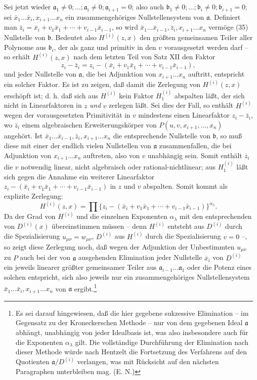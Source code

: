 \documentclass[11pt]{article}
\providecommand{\aideal}{\mathfrak a}
\providecommand{\bideal}{\mathfrak b}
\begin{document}
Sei jetzt wieder $\aideal_1\ne0;\ldots;\aideal_i\ne0;\aideal_{i+1}=0$; also auch $\bideal_1\ne0;\ldots;\bideal_i\ne0;\bideal_{i+1}=0$; sei $\bar x_1\ldots\bar x_i,x_{i+1}\ldots x_n$ ein zusammengehöriges Nullstellensystem von $\aideal$. Definiert man $\bar z_i=\bar x_i+v_1\bar x_1+\cdots+v_{i-1}\bar x_{i-1}$, so wird $\bar x_1\ldots\bar x_{i-1},\bar z_i,x_{i+1}\ldots x_n$ vermöge (35) Nullstelle von $\bideal$. Bedeutet also $H^{(i)}(z,x)$ den größten gemeinsamen Teiler aller Polynome aus $\bideal_i$, der als ganz und primitiv in den $v$ vorausgesetzt werden darf -- so erhält $H^{(i)}(z,x)$ nach dem letzten Teil von Satz XII den Faktor
\[
 z_i-\bar z_i=z_i-(\bar x_i+v_1\bar x_1+\cdots+v_{i-1}\bar x_{i-1}),
\]
und jeder Nullstelle von $\aideal$, die bei Adjunktion von $x_{i+1}\ldots x_n$ auftritt, entspricht ein solcher Faktor. Es ist zu zeigen, daß damit die Zerlegung von $H^{(i)}(z,x)$ erschöpft ist; d. h. daß sich aus $H^{(i)}$ kein Faktor $H^{(i)}_1$ abspalten läßt, der sich nicht in Linearfaktoren in $z$ \emph{und} $v$ zerlegen läßt. Sei dies der Fall, so enthält $H^{(i)}$ wegen der vorausgesetzten Primitivität in $v$ mindestens einen Linearfaktor $z_i-\bar z_i$, wo $\bar z_i$ einem algebraischen Erweiterungskörper von $P(u,v,x_{i+1},\ldots,x_n)$ angehört. Ist $\bar x_1\ldots\bar x_{i-1},\bar z_i,x_{i+1}\ldots x_n$ die entsprechende Nullstelle von $\bideal$, so muß diese mit einer der endlich vielen Nullstellen von $\aideal$ zusammenfallen, die bei Adjunktion von $x_{i+1}\ldots x_n$ auftreten, also von $v$ unabhängig sein. Somit enthält $\bar z_i$ die $v$ notwendig linear, nicht algebraisch oder rational-nichtlinear; aus $H^{(i)}_1$ läßt sich gegen die Annahme ein weiterer Linearfaktor $z_i-(\bar x_i+v_1\bar x_1+\cdots+v_{i-1}\bar x_{i-1})$ in $z$ und $v$ abspalten. Somit kommt als explizite Zerlegung:
\[
 H^{(i)}(z,x)=\prod \{z_i-(\bar x_i+v_1\bar x_1+\cdots+v_{i-1}\bar x_{i-1})\}^{\alpha_\lambda}.
\]
Da der Grad von $H^{(i)}$ und die einzelnen Exponenten $\alpha_\lambda$ mit den entsprechenden von $D^{(i)}(x)$ übereinstimmen müssen -- denn $H^{(i)}$ entsteht aus $D^{(i)}$ durch die Spezialisierung $u_{\mu\nu}=w_{\mu\nu}$, $D^{(i)}$ aus $H^{(i)}$ durch die Spezialisierung $v=0$ --, so zeigt diese Zerlegung noch, daß wegen der Adjunktion der Unbestimmten $u_{\mu\nu}$ zu $P$ auch bei der von $\aideal$ ausgehenden Elimination jeder Nullstelle $\bar x_i$ von $D^{(i)}$ ein jeweils linearer größter gemeinsamer Teiler aus $\aideal_{i-1}\ldots\aideal_1$ oder die Potenz eines solchen entspricht, sich also jeweils nur ein zusammengehöriges Nullstellensystem $\bar x_1\ldots\bar x_i,x_{i+1}\ldots x_n$ von $\aideal$ ergibt.\footnote{Es sei darauf hingewiesen, daß die hier gegebene sukzessive Elimination -- im Gegensatz zu der Kroneckerschen Methode -- nur von dem gegebenen Ideal $\aideal$ abhängt, unabhängig von jeder Idealbasis ist, was also insbesondere auch für die Exponenten $\alpha_\lambda$ gilt. Die vollständige Durchführung der Elimination nach dieser Methode würde nach Hentzelt die Fortsetzung des Verfahrens auf den Quotienten $\aideal/D^{(i)}$ verlangen, was mit Rücksicht auf den nächsten Paragraphen unterbleiben mag. (E. N.)}
\end{document}
